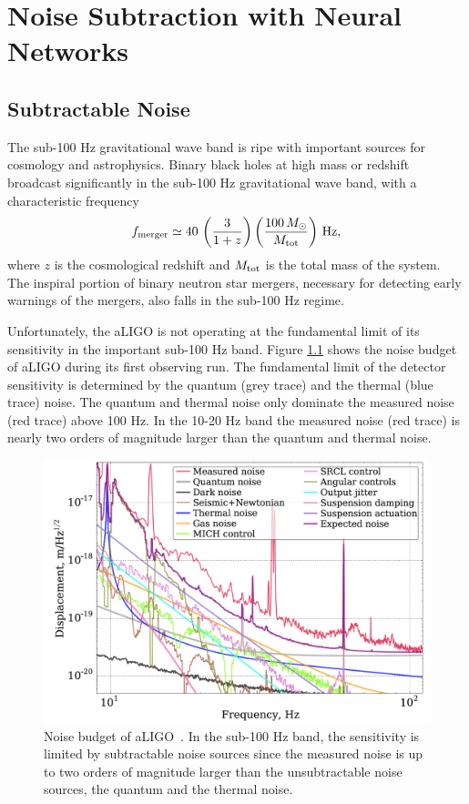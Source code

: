 \chapter{Noise Subtraction with Neural Networks}
\label{chap:nohair}

\begin{refsection}

\section{Subtractable Noise}

The sub-100 Hz gravitational wave band is ripe with important sources for cosmology and astrophysics. Binary black holes at high mass or redshift broadcast significantly in the sub-100 Hz gravitational wave band, with a characteristic frequency
\begin{equation}
f_{\rm merger} \simeq 40\,\left(\frac{3}{1+z}\right)\left(\frac{100\,M_\odot}{M_{\rm tot}}\right)\,{\rm Hz},
\end{equation}
where $z$ is the cosmological redshift and $M_{\rm tot}$ is the total mass of the system. The inspiral portion of binary neutron star mergers, necessary for detecting early warnings of the mergers, also falls in the sub-100 Hz regime. 

Unfortunately, the aLIGO is not operating at the fundamental limit of its sensitivity in the important sub-100 Hz band. Figure 
\ref{fig:noiseBudget} 
shows the noise budget of aLIGO during its first observing run. The fundamental limit of the detector sensitivity is determined by the quantum (grey trace) and the thermal (blue trace) noise. The quantum and thermal noise only dominate the measured noise (red trace) above 100 Hz. In the 10-20 Hz band the measured noise (red trace) is nearly two orders of magnitude larger than the quantum and thermal noise.

\begin{figure}[htbp]
   \centering
   \includegraphics[width=\columnwidth]{chapter_noise_sub/etc/noiseBudget}
   \caption[Noise Budget]{Noise budget of aLIGO~\cite{Martynov:16}.
     In the sub-100 Hz band, the sensitivity is limited by subtractable noise sources since the measured noise is up to two orders of magnitude larger than the unsubtractable noise sources, the quantum and the thermal noise.}
   \label{fig:noiseBudget}
\end{figure}


\end{refsection}
